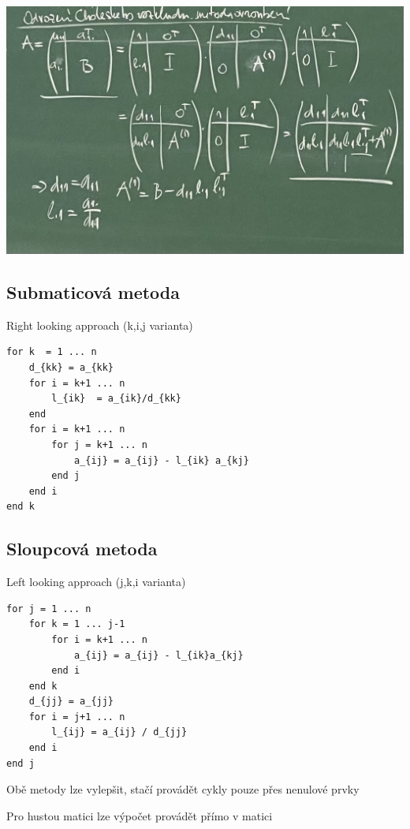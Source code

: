 \documentclass[../main.tex]{subfiles}
\begin{document}
\begin{center}
    \includegraphics[width=0.5\linewidth]{images/12-10-odvozeni.jpg}
\end{center}




\subsection{Submaticová metoda}
Right looking approach (k,i,j varianta)

\begin{minipage}{0.95\linewidth}
\begin{verbatim}
for k  = 1 ... n 
    d_{kk} = a_{kk}
    for i = k+1 ... n
        l_{ik}  = a_{ik}/d_{kk}
    end
    for i = k+1 ... n
        for j = k+1 ... n
            a_{ij} = a_{ij} - l_{ik} a_{kj}
        end j
    end i
end k
\end{verbatim}
\end{minipage}


\subsection{Sloupcová metoda}
Left looking approach (j,k,i varianta)

\begin{minipage}{0.95\linewidth}
\begin{verbatim}
for j = 1 ... n 
    for k = 1 ... j-1
        for i = k+1 ... n
            a_{ij} = a_{ij} - l_{ik}a_{kj}
        end i
    end k
    d_{jj} = a_{jj}
    for i = j+1 ... n
        l_{ij} = a_{ij} / d_{jj}
    end i 
end j
\end{verbatim}    
\end{minipage}


\begin{remark}
    Obě metody lze vylepšit, stačí provádět cykly pouze přes nenulové prvky
\end{remark}

\begin{remark}
    Pro hustou matici lze výpočet provádět přímo v matici \matA 
\end{remark}
\end{document}
